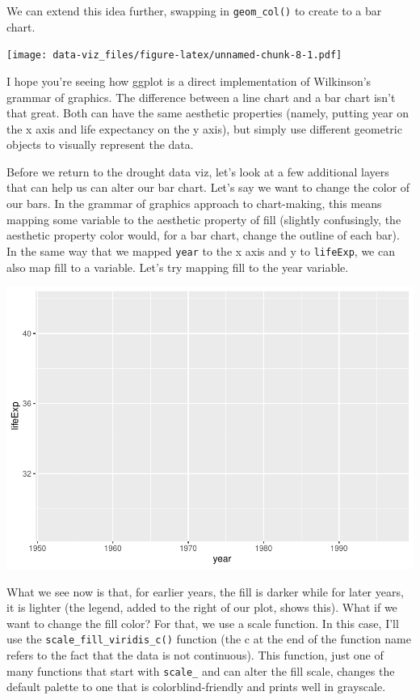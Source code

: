 \documentclass[
]{book}
\begin{document}
We can extend this idea further, swapping in \texttt{geom\_col()} to create to a bar chart.

\texttt{[image: data-viz\_files/figure-latex/unnamed-chunk-8-1.pdf]}

I hope you're seeing how ggplot is a direct implementation of Wilkinson's grammar of graphics. The difference between a line chart and a bar chart isn't that great. Both can have the same aesthetic properties (namely, putting year on the x axis and life expectancy on the y axis), but simply use different geometric objects to visually represent the data.

Before we return to the drought data viz, let's look at a few additional layers that can help us can alter our bar chart. Let's say we want to change the color of our bars. In the grammar of graphics approach to chart-making, this means mapping some variable to the aesthetic property of fill (slightly confusingly, the aesthetic property color would, for a bar chart, change the outline of each bar). In the same way that we mapped \texttt{year} to the x axis and y to \texttt{lifeExp}, we can also map fill to a variable. Let's try mapping fill to the year variable.

\includegraphics{data-viz_files/figure-latex/unnamed-chunk-9-1.pdf}

What we see now is that, for earlier years, the fill is darker while for later years, it is lighter (the legend, added to the right of our plot, shows this). What if we want to change the fill color? For that, we use a scale function. In this case, I'll use the \texttt{scale\_fill\_viridis\_c()} function (the c at the end of the function name refers to the fact that the data is not continuous). This function, just one of many functions that start with \texttt{scale\_} and can alter the fill scale, changes the default palette to one that is colorblind-friendly and prints well in grayscale.
\end{document}
